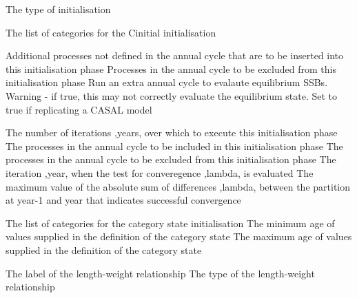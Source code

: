  {The type of initialisation}
\par\textbf{}\par
{} {The list of categories for the Cinitial initialisation}
\par\textbf{}\par
{} {Additional processes not defined in the annual cycle that are to be inserted into this initialisation phase}
 {Processes in the annual cycle to be excluded from this initialisation phase}
 {Run an extra annual cycle to evalaute equilibrium SSBs. Warning - if true, this may not correctly evaluate the equilibrium state. Set to true if replicating a CASAL model}
\par\textbf{}\par
{} {The number of iterations ,years, over which to execute this initialisation phase}
 {The processes in the annual cycle to be included in this initialisation phase}
 {The processes in the annual cycle to be excluded from this initialisation phase}
 {The iteration ,year, when the test for converegence ,lambda, is evaluated}
 {The maximum value of the absolute sum of differences ,lambda, between the partition at year-1 and year that indicates successful convergence}
\par\textbf{}\par
{} {The list of categories for the category state initialisation}
 {The minimum age of values supplied in the definition of the category state}
 {The maximum age of values supplied in the definition of the category state}
\par\par
{} {The label of the length-weight relationship}
 {The type of the length-weight relationship}
\par\par
{}\par\par
